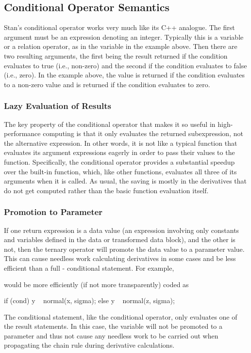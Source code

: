 \subsection{Conditional Operator Semantics}

Stan's conditional operator works very much like its C++ analogue.
The first argument must be an expression denoting an integer.
Typically this is a variable or a relation operator, as in the
variable  in the example above.  Then there are two resulting
arguments, the first being the result returned if the condition
evaluates to true (i.e., non-zero) and the second if the condition
evaluates to false (i.e., zero).  In the example above, the value
 is returned if the condition evaluates to a non-zero value
and  is returned if the condition evaluates to zero.

\subsubsection{Lazy Evaluation of Results}

The key property of the conditional operator that makes it so useful
in high-performance computing is that it only evaluates the returned
subexpression, not the alternative expression.  In other words, it is
not like a typical function that evaluates its argument expressions
eagerly in order to pass their values to the function.  Specifically,
the conditional operator provides a substantial speedup over the
built-in  function, which, like other functions, evaluates
all three of its arguments when it is called.  As usual, the saving is
mostly in the derivatives that do not get computed rather than the
basic function evaluation itself.

\subsubsection{Promotion to Parameter}

If one return expression is a data value (an expression involving only
constants and variables defined in the data or transformed data
block), and the other is not, then the ternary operator will promote
the data value to a parameter value.  This can cause needless work
calculating derivatives in some cases and be less efficient than a full
- conditional statement.  For example,
%
\begin{stancode}
data {
  real x[10];
  ...
parameters {
  real z[10];
  ...
model {
  y ~ normal(cond ? x : z, sigma);
  ...
\end{stancode}
%
would be more efficiently (if not more transparently) coded as
%
\begin{stancode}
if (cond)
  y ~ normal(x, sigma);
else
  y ~ normal(z, sigma);
\end{stancode}
%
The conditional statement, like the conditional operator, only
evaluates one of the result statements.  In this case, the variable
 will not be promoted to a parameter and thus not cause any
needless work to be carried out when propagating the chain rule during
derivative calculations.


